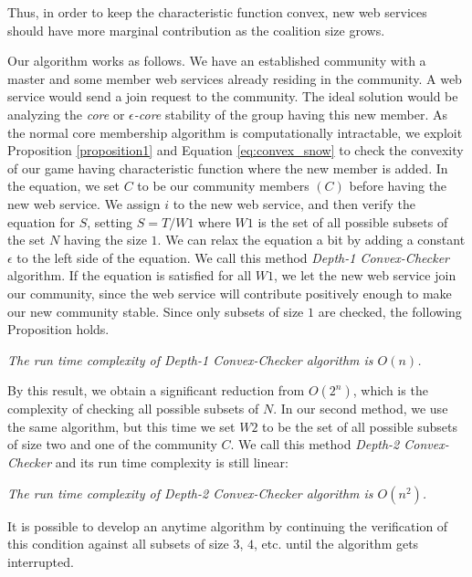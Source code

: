 Thus, in order to keep the characteristic function convex, new web
services should have more marginal contribution as the coalition
size grows.

Our algorithm works as follows. We have an established community
with a master and some member web services already residing in the
community. A web service would send a join request to the
community. The ideal solution would be analyzing the \emph{core}
or \emph{$\epsilon$-core} stability of the group having this new
member. As the normal core membership algorithm is computationally
intractable, we exploit Proposition \ref{proposition1} and Equation
\ref{eq:convex_snow} to check the convexity of our game having
characteristic function where the new member is added. In the
equation, we set $C$ to be our community members $(C)$ before
having the new web service. We assign ${i}$ to the new web
service, and then verify the equation for $S$, setting $ S = T /
W1 $ where $W1$ is the set of all possible subsets of the set $N$
having the size $1$. We can relax the equation a bit by adding a
constant $\epsilon$ to the left side of the equation. We call this
method \emph{Depth-1 Convex-Checker} algorithm. If the equation is
satisfied for all $W1$, we let the new web service join our
community, since the web service will contribute positively enough
to make our new community stable. Since only subsets of size $1$
are checked, the following Proposition holds.

\begin{theorem}\label{complexity1}
\emph{The run time complexity of Depth-1 Convex-Checker algorithm is
$O(n)$.}
\end{theorem}

By this result, we obtain a significant reduction from $O(2^n)$,
which is the complexity of checking all possible subsets of $N$.
In our second method, we use the same algorithm, but this time we
set $W2$ to be the set of all possible subsets of size two and one
of the community $C$. We call this method \emph{Depth-2
Convex-Checker} and its run time complexity is still
linear:

\begin{theorem}\label{complexity2}
\emph{The run time complexity of Depth-2 Convex-Checker algorithm is
$O(n^2)$.}
\end{theorem}

It is possible to develop an anytime algorithm by continuing the
verification of this condition against all subsets of size $3$,
$4$, etc. until the algorithm gets interrupted.

